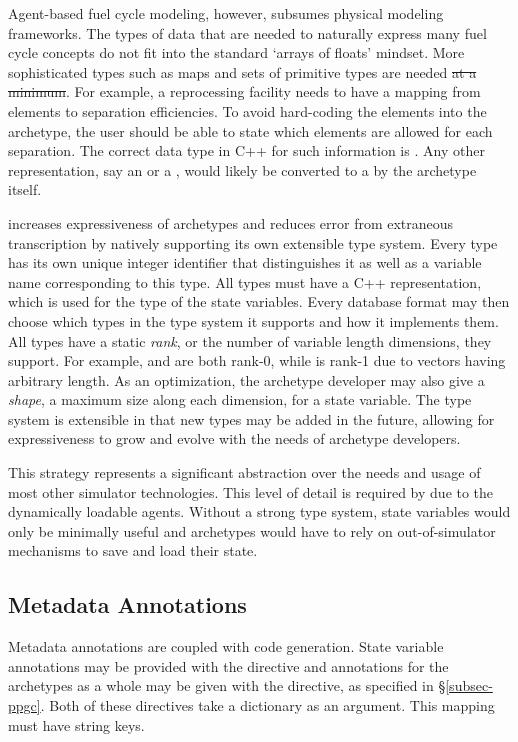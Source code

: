 Agent-based fuel cycle modeling, however, subsumes physical modeling frameworks.
The types of data that are needed to naturally express many fuel cycle concepts 
do not fit into the standard `arrays of floats' mindset.  More sophisticated types
such as maps and sets of primitive types are needed \sout{at a minimum}. For example, 
a reprocessing facility needs to have a mapping from elements to separation 
efficiencies. To avoid hard-coding the elements into the archetype, the user should 
be able to state which elements are allowed for each separation. The correct data
type in C++ for such information is . Any other 
representation, say an  or a ,  would likely be converted to 
a  by the archetype itself.

\Cyclus increases expressiveness of archetypes and reduces error from extraneous 
transcription by natively supporting its own extensible type system. Every type
has its own unique integer identifier that distinguishes it as well as 
a variable name corresponding to this type. All types
must have a C++ representation, which is used for the type of the state
variables. Every database format may then choose which types in the type system it 
supports and how it implements them. All types have a static \emph{rank}, or the 
number of variable length dimensions, they support.  For example,  and 
 are both rank-0, while  is rank-1 due to 
vectors having arbitrary length. As an optimization, the archetype developer 
may also give a \emph{shape}, a maximum size along each dimension, for a state 
variable. The type system is extensible in that new types may be added in the future, 
allowing for expressiveness to grow and evolve with the needs of archetype developers.

This strategy represents a significant abstraction over the needs and usage of most 
other simulator technologies. This level of detail is required by \cyclus due to the
dynamically loadable agents. Without a strong type system, state variables 
would only be minimally useful and archetypes would have to rely on out-of-simulator
mechanisms to save and load their state.

\subsection{Metadata Annotations}

Metadata annotations are coupled with code generation.  State variable annotations
may be provided with the  directive and annotations for 
the archetypes as a whole may be given with the  directive,
as specified in \S \ref{subsec-ppgc}. Both of these directives take a dictionary 
as an argument. This mapping must have string keys.

